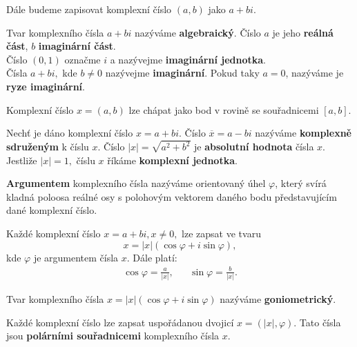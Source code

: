 \begin{pozn}
    Dále budeme zapisovat komplexní číslo $(a,b)$ jako $a+bi.$
\end{pozn}

\begin{definition}
    Tvar komplexního čísla $a+bi$ nazýváme \textbf{algebraický}. Číslo $a$ je jeho
   \textbf{reálná část}, $b$ \textbf{imaginární část}.\\
  Číslo $(0,1)$ označme $i$ a nazývejme \textbf{imaginární jednotka}. \\
  Čísla $a+bi,$ kde $b\ne 0$ nazývejme \textbf{imaginární}. Pokud taky $a=0$,
  nazýváme je \textbf{ryze imaginární}.
\end{definition}

\begin{pozn}
    Komplexní číslo $x=(a,b)$ lze chápat jako bod v rovině se souřadnicemi $[a,b].$
\end{pozn}

\begin{definition}
    Nechť je dáno komplexní číslo $x= a+bi.$ Číslo $\overline{x}=a-bi$ nazýváme
   \textbf{komplexně sdruženým} k číslu $x$. Číslo $|x|=\sqrt{a^2+b^2}$ je
   \textbf{absolutní hodnota} čísla $x$. Jestliže $|x|=1,$ číslu $x$ říkáme \textbf{komplexní jednotka}.
\end{definition}

\begin{definition}
\textbf{Argumentem} komplexního čísla nazýváme orientovaný úhel $\varphi$, který svírá kladná
poloosa reálné osy s polohovým vektorem daného bodu představujícím dané komplexní číslo.
\end{definition}

\begin{veta}
    Každé komplexní číslo $x=a+bi, x\ne 0,$ lze zapsat ve tvaru
    $$x=|x|(\cos \varphi + i \sin \varphi),$$
    kde $\varphi$ je argumentem čísla $x$. Dále platí:
    \begin{align*}
        \cos \varphi = \frac{a}{|x|}, && \sin \varphi = \frac{b}{|x|}.
    \end{align*}
\end{veta}

\begin{definition}
    Tvar komplexního čísla $x= |x|(\cos \varphi + i\sin\varphi)$ nazýváme \textbf{goniometrický}.
\end{definition}

\begin{pozn}
    Každé komplexní číslo lze zapsat uspořádanou dvojicí $x=(|x|, \varphi).$
    Tato čísla jsou \textbf{polárními souřadnicemi} komplexního čísla $x$.
\end{pozn}

